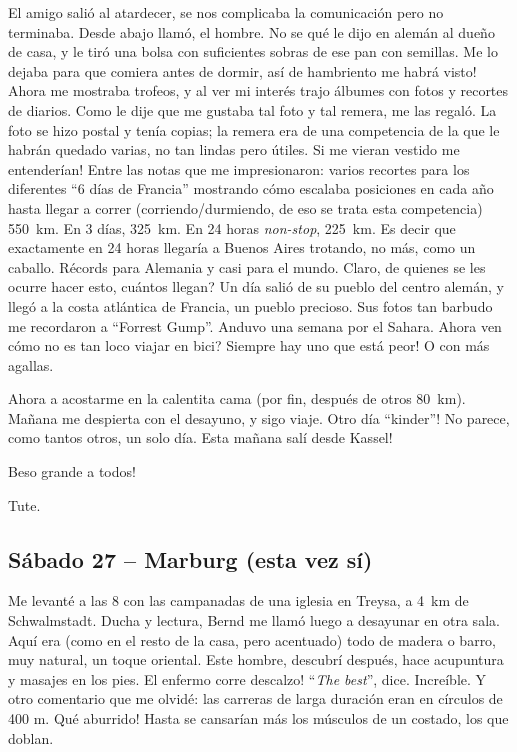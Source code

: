 El amigo sali\'o al atardecer, se nos complicaba la comunicaci\'on pero no
terminaba. Desde abajo llam\'o, el hombre. No se qu\'e le dijo en alem\'an al
due\~no de casa, y le tir\'o una bolsa con suficientes sobras de ese pan con
semillas. Me lo dejaba para que comiera antes de dormir, \textexclamdown as\'i
de hambriento me habr\'a visto! Ahora me mostraba trofeos, y al ver mi inter\'es
trajo \'albumes con fotos y recortes de diarios. Como le dije que me gustaba tal
foto y tal remera, me las regal\'o. La foto se hizo postal y ten\'ia copias; la
remera era de una competencia de la que le habr\'an quedado varias, no tan
lindas pero \'utiles. \textexclamdown Si me vieran vestido me entender\'ian!
Entre las notas que me impresionaron: varios recortes para los diferentes ``6
d\'ias de Francia'' mostrando c\'omo escalaba posiciones en cada a\~no hasta
llegar a correr (corriendo/durmiendo, de eso se trata esta competencia) 550~km.
En 3 d\'ias, 325~km. En 24 horas \emph{non-stop}, 225~km. Es decir que
exactamente en 24 horas llegar\'ia a Buenos Aires trotando, no m\'as, como un
caballo. R\'ecords para Alemania y casi para el mundo. Claro, de quienes se les
ocurre hacer esto, \textquestiondown cu\'antos llegan? Un d\'ia sali\'o de su
pueblo del centro alem\'an, y lleg\'o a la costa atl\'antica de Francia, un
pueblo precioso. Sus fotos tan barbudo me recordaron a ``Forrest Gump''. Anduvo
una semana por el Sahara. \textquestiondown Ahora ven c\'omo no es tan loco
viajar en bici? \textexclamdown Siempre hay uno que est\'a peor! O con m\'as
agallas.

Ahora a acostarme en la calentita cama (por fin, despu\'es de otros
80~km). Ma\~nana me despierta con el desayuno, y sigo viaje. \textexclamdown
Otro d\'ia ``kinder''! No parece, como tantos otros, un solo d\'ia.
\textexclamdown Esta ma\~nana sal\'i desde Kassel!

\textexclamdown Beso grande a todos!

Tute.

\subsection*{S\'abado 27 -- Marburg (esta vez s\'i)}

Me levant\'e a las 8 con las campanadas de una iglesia en Treysa, a 4~km de
Schwalmstadt. Ducha y lectura, Bernd me llam\'o luego a desayunar en
otra sala. Aqu\'i era (como en el resto de la casa, pero acentuado) todo de
madera o barro, muy natural, un toque oriental. Este hombre, descubr\'i
despu\'es, hace acupuntura y masajes en los pies. \textexclamdown El enfermo
corre descalzo! ``\emph{The best}'', dice. Incre\'ible. Y otro comentario que
me olvid\'e: las carreras de larga duraci\'on eran en c\'irculos de 400 m.
\textexclamdown Qu\'e aburrido! Hasta se cansar\'ian m\'as los m\'usculos de
un costado, los que doblan.

